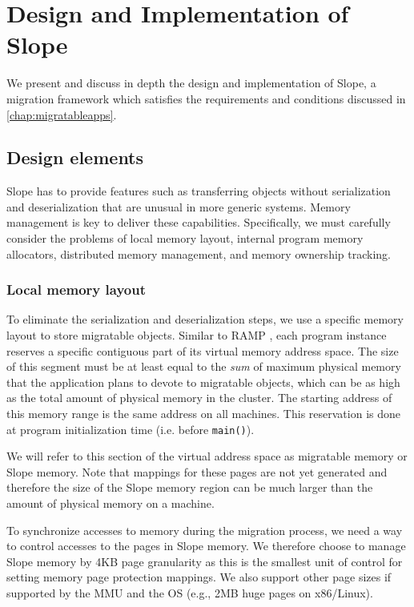 \chapter{Design and Implementation of Slope}
\label{chap:design}


We present and discuss in depth the design and implementation of Slope, a migration framework which
satisfies the requirements and conditions discussed in \autoref{chap:migratableapps}.

\section{Design elements}
\label{sec:deselem}
Slope has to provide features such as transferring objects without serialization
and deserialization that are unusual in more generic systems.
Memory management is key to deliver these capabilities. Specifically, we must
carefully consider the problems of local memory layout, internal program memory
allocators, distributed memory management, and memory ownership tracking.

\subsection{Local memory layout}
\label{sec:localmem}
To eliminate the serialization and deserialization steps, we use a specific
memory layout to store migratable objects.
Similar to RAMP \cite{memon2018ramp}, each program instance reserves a
specific contiguous part of its virtual memory address space. The size of this
segment must be at least equal to the \emph{sum} of maximum physical memory that the
application plans to devote to migratable objects, which can be
as high as the total amount of physical memory in the cluster.
The starting address of this memory range is the same address on all machines.
This reservation is done at program initialization time
(i.e. before \texttt{main()}).

We will refer to this section of the virtual
address space as migratable memory or Slope memory. Note that mappings for
these pages are not yet generated and therefore the size of the Slope memory
region can be much larger than the amount of physical memory on a machine.

To synchronize accesses to memory during the migration process, we need a way
to control accesses to the pages in Slope memory. We therefore choose to manage
Slope memory by 4KB page granularity as this is the smallest unit of control
for setting memory page protection mappings. We also support other page sizes
if supported by the MMU and the OS (e.g., 2MB huge pages on x86/Linux).


